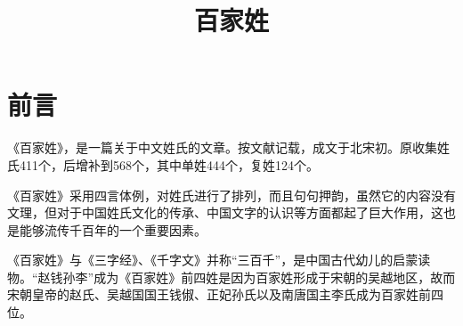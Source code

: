 \documentclass[a4paper,12pt,UTF8,twoside]{ctexbook}
\title{\heiti\zihao{0} 百家姓}
\author{}
\date{}
\begin{document}
\maketitle
\tableofcontents

\frontmatter
\chapter{前言}

《百家姓》，是一篇关于中文姓氏的文章。按文献记载，成文于北宋初。原收集姓氏411个，后增补到568个，其中单姓444个，复姓124个。

《百家姓》采用四言体例，对姓氏进行了排列，而且句句押韵，虽然它的内容没有文理，但对于中国姓氏文化的传承、中国文字的认识等方面都起了巨大作用，这也是能够流传千百年的一个重要因素。

《百家姓》与《三字经》、《千字文》并称“三百千”，是中国古代幼儿的启蒙读物。“赵钱孙李”成为《百家姓》前四姓是因为百家姓形成于宋朝的吴越地区，故而宋朝皇帝的赵氏、吴越国国王钱俶、正妃孙氏以及南唐国主李氏成为百家姓前四位。



\mainmatter
\end{document}
